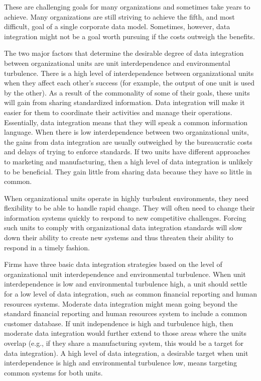 \documentclass[
]{article}
\begin{document}
These are challenging goals for many organizations and sometimes take
years to achieve. Many organizations are still striving to achieve the
fifth, and most difficult, goal of a single corporate data model.
Sometimes, however, data integration might not be a goal worth pursuing
if the costs outweigh the benefits.

The two major factors that determine the desirable degree of data
integration between organizational units are unit interdependence and
environmental turbulence. There is a high level of interdependence
between organizational units when they affect each other's success (for
example, the output of one unit is used by the other). As a result of
the commonality of some of their goals, these units will gain from
sharing standardized information. Data integration will make it easier
for them to coordinate their activities and manage their operations.
Essentially, data integration means that they will speak a common
information language. When there is low interdependence between two
organizational units, the gains from data integration are usually
outweighed by the bureaucratic costs and delays of trying to enforce
standards. If two units have different approaches to marketing and
manufacturing, then a high level of data integration is unlikely to be
beneficial. They gain little from sharing data because they have so
little in common.

When organizational units operate in highly turbulent environments, they
need flexibility to be able to handle rapid change. They will often need
to change their information systems quickly to respond to new
competitive challenges. Forcing such units to comply with organizational
data integration standards will slow down their ability to create new
systems and thus threaten their ability to respond in a timely fashion.

Firms have three basic data integration strategies based on the level of
organizational unit interdependence and environmental turbulence. When
unit interdependence is low and environmental turbulence high, a unit
should settle for a low level of data integration, such as common
financial reporting and human resources systems. Moderate data
integration might mean going beyond the standard financial reporting and
human resources system to include a common customer database. If unit
independence is high and turbulence high, then moderate data integration
would further extend to those areas where the units overlap (e.g., if
they share a manufacturing system, this would be a target for data
integration). A high level of data integration, a desirable target when
unit interdependence is high and environmental turbulence low, means
targeting common systems for both units.
\end{document}
